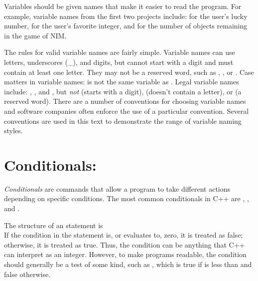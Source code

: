 Variables should be given names that make it easier to read the program.  For example, variable names from the first two projects include:  for the user's lucky number,  for the user's favorite integer, and  for the number of objects remaining in the game of NIM.  

The rules for valid variable names are fairly simple.  Variable names can use letters, underscores (\_), and digits, but cannot start with a digit and must contain at least one letter.   They may not be a reserved word, such as , , or .  Case matters in variable names:  is not the same variable as .  Legal variable names include: , , and , but \emph{not}  (starts with a digit),  (doesn't contain a letter), or  (a reserved word).  There are a number of conventions for choosing variable names and software companies often enforce the use of a particular convention.  Several  conventions are used in this text to demonstrate the range of variable naming styles.




\section{Conditionals: }\label{appendix:conditionals}

\emph{Conditionals} are commands that allow a program to take different actions depending on specific conditions.  The most common conditionals in C++ are ,  , and .

The structure of an  statement is\\
If the condition in the   statement is, or evaluates to, zero, it is treated as false; otherwise, it is treated as true.  Thus, the condition can be anything that C++ can interpret as an integer.  However, to make programs readable, the condition should generally be a test of some kind, such as  , which is true if  is less than  and false otherwise.

